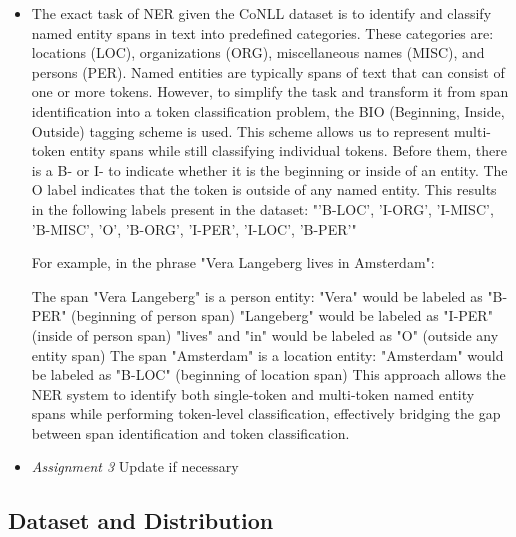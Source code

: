 \documentclass[11pt]{article}
\begin{document}
\begin{itemize}
    \item[]
          The exact task of NER given the CoNLL dataset is to identify and classify named entity spans in text into predefined categories.
          These categories are: locations (LOC), organizations (ORG), miscellaneous names (MISC), and persons (PER).
          Named entities are typically spans of text that can consist of one or more tokens.
          However, to simplify the task and transform it from span identification into a token classification problem, the BIO (Beginning, Inside, Outside) tagging scheme is used.
          This scheme allows us to represent multi-token entity spans while still classifying individual tokens.
          Before them, there is a B- or I- to indicate whether it is the beginning or inside of an entity.
          The O label indicates that the token is outside of any named entity.
          This results in the following labels present in the dataset:
          "{'B-LOC', 'I-ORG', 'I-MISC', 'B-MISC', 'O', 'B-ORG', 'I-PER', 'I-LOC', 'B-PER'}"

          For example, in the phrase "Vera Langeberg lives in Amsterdam":

          The span "Vera Langeberg" is a person entity:
          "Vera" would be labeled as "B-PER" (beginning of person span)
          "Langeberg" would be labeled as "I-PER" (inside of person span)
          "lives" and "in" would be labeled as "O" (outside any entity span)
          The span "Amsterdam" is a location entity:
          "Amsterdam" would be labeled as "B-LOC" (beginning of location span)
          This approach allows the NER system to identify both single-token and multi-token named entity spans while performing token-level classification, effectively bridging the gap between span identification and token classification.
    \item[] \textit{Assignment 3} Update if necessary
\end{itemize}

\subsection{Dataset and Distribution}
\end{document}
